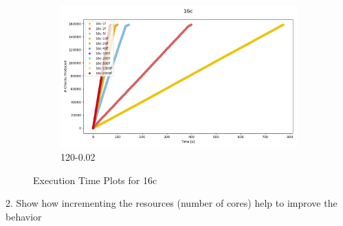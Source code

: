 \documentclass[12pt,a4paper]{article}
\begin{document}
\begin{figure}[H]
    \vspace{0.5cm} %
    \begin{subfigure}[b]{\textwidth}
        \centering
        \includegraphics[scale=0.5]{../processed/NRT/small/checks/120-0.02/fixedcores/16c/plots/traces.png}
        \caption{120-0.02}
    \end{subfigure}

    \caption{Execution Time Plots for 16c}
    \label{img:exps-read-input-variants}
\end{figure}


2. Show how incrementing the resources (number of cores) help to improve the behavior
\end{document}
